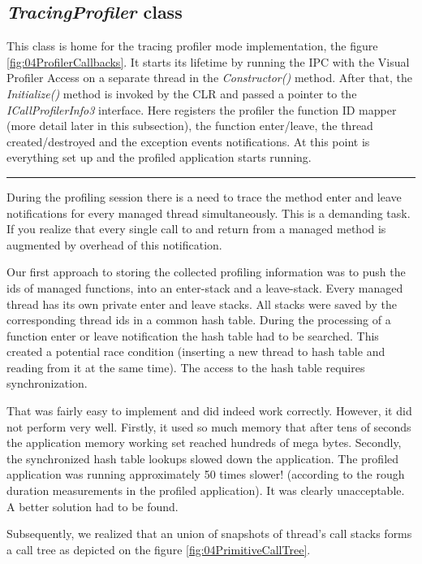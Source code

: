 \subsection{\textit{TracingProfiler} class}
This class is home for the tracing profiler mode implementation, the figure \ref{fig:04ProfilerCallbacks}. It starts its lifetime by running the IPC with the Visual Profiler Access on a separate thread in the \textit{Constructor()} method. After that, the \textit{Initialize()} method is invoked by the CLR and passed a pointer to the \textit{ICallProfilerInfo3} interface. Here registers the profiler the function ID mapper (more detail later in this subsection), the function enter/leave, the thread created/destroyed and the exception events notifications. At this point is everything set up and the profiled application starts running.

\begin{center}
\rule{300pt}{1.5pt}
\end{center}
During the profiling session there is a need to trace the method enter and leave notifications for every managed thread simultaneously. This is a demanding task. If you realize that every single call to and return from a managed method is augmented by overhead of this notification. 

Our first approach to storing the collected profiling information was to push the ids of managed functions, into an enter-stack and a leave-stack. Every managed thread has its own private enter and leave stacks. All stacks were saved by the corresponding thread ids in a common hash table. During the processing of a function enter or leave notification the hash table had to be searched. This created a potential race condition (inserting a new thread to hash table and reading from it at the same time). The access to the hash table requires synchronization.

That was fairly easy to implement and did indeed work correctly. However, it did not perform very well. Firstly, it used so much memory that after tens of seconds the application memory working set reached hundreds of mega bytes. Secondly, the synchronized hash table lookups slowed down the application. The profiled application was running approximately 50 times slower! (according to the rough duration measurements in the profiled application). It was clearly unacceptable. A better solution had to be found. 

Subsequently, we realized that an union of snapshots of thread's call stacks forms a call tree as depicted on the figure \ref{fig:04PrimitiveCallTree}.


